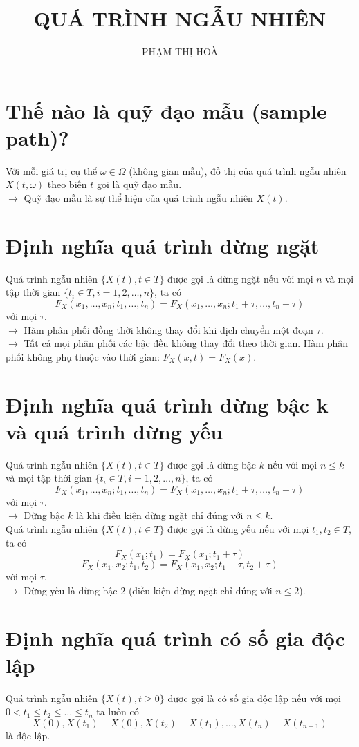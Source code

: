 \documentclass{article}
\title{QUÁ TRÌNH NGẪU NHIÊN}
\author{PHẠM THỊ HOÀ}
\begin{document}
\maketitle

\section{Thế nào là quỹ đạo mẫu (sample path)?}
Với mỗi giá trị cụ thể $\omega \in \Omega$ (không gian mẫu), đồ thị của quá trình ngẫu nhiên $X(t, \omega)$ theo biến $t$ gọi là quỹ đạo mẫu.\\
$\rightarrow$ Quỹ đạo mẫu là sự thể hiện của quá trình ngẫu nhiên $X(t)$.

\section{Định nghĩa quá trình dừng ngặt}
Quá trình ngẫu nhiên $\{X(t), t \in T\}$ được gọi là dừng ngặt nếu với mọi $n$ và mọi tập thời gian $\{t_i \in T, i = 1, 2, \ldots, n\}$, ta có
\[
F_X(x_1, \ldots, x_n; t_1, \ldots, t_n) = F_X(x_1, \ldots, x_n; t_1 + \tau, \ldots, t_n + \tau)
\]
với mọi $\tau$.\\
$\rightarrow$ Hàm phân phối đồng thời không thay đổi khi dịch chuyển một đoạn $\tau$.\\
$\rightarrow$ Tất cả mọi phân phối các bậc đều không thay đổi theo thời gian. Hàm phân phối không phụ thuộc vào thời gian: $F_X(x, t) = F_X(x)$.

\section{Định nghĩa quá trình dừng bậc k và quá trình dừng yếu}
Quá trình ngẫu nhiên $\{X(t), t \in T\}$ được gọi là dừng bậc $k$ nếu với mọi $n \leq k$ và mọi tập thời gian $\{t_i \in T, i = 1, 2, \ldots, n\}$, ta có
\[
F_X(x_1, \ldots, x_n; t_1, \ldots, t_n) = F_X(x_1, \ldots, x_n; t_1 + \tau, \ldots, t_n + \tau)
\]
với mọi $\tau$.\\
$\rightarrow$ Dừng bậc $k$ là khi điều kiện dừng ngặt chỉ đúng với $n \leq k$.\\
Quá trình ngẫu nhiên $\{X(t), t \in T\}$ được gọi là dừng yếu nếu với mọi $t_1, t_2 \in T$, ta có
\[
F_X(x_1; t_1) = F_X(x_1; t_1 + \tau)
\]
\[
F_X(x_1, x_2; t_1, t_2) = F_X(x_1, x_2; t_1 + \tau, t_2 + \tau)
\]
với mọi $\tau$.\\
$\rightarrow$ Dừng yếu là dừng bậc 2 (điều kiện dừng ngặt chỉ đúng với $n \leq 2$).

\section{Định nghĩa quá trình có số gia độc lập}
Quá trình ngẫu nhiên $\{X(t), t \geq 0\}$ được gọi là có số gia độc lập nếu với mọi $0 < t_1 \leq t_2 \leq \ldots \leq t_n$ ta luôn có
\[
X(0), X(t_1) - X(0), X(t_2) - X(t_1), \ldots, X(t_n) - X(t_{n-1})
\]
là độc lập.
\end{document}
